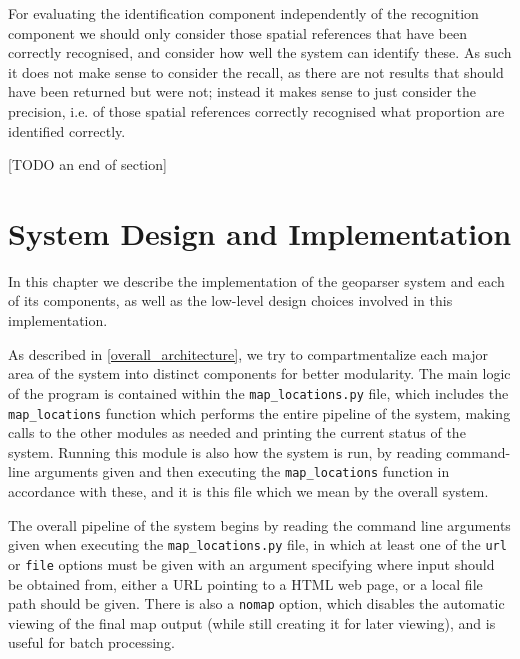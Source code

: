 \documentclass[12pt, a4paper]{report}
\begin{document}
For evaluating the identification component independently of the recognition component we should only consider those spatial references that have been correctly recognised, and consider how well the system can identify these. As such it does not make sense to consider the recall, as there are not results that should have been returned but were not; instead it makes sense to just consider the precision, i.e. of those spatial references correctly recognised what proportion are identified correctly.

[TODO an end of section] 






\chapter{System Design and Implementation}

In this chapter we describe the implementation of the geoparser system and each of its components, as well as the low-level design choices involved in this implementation.

As described in \ref{overall_architecture}, we try to compartmentalize each major area of the system into distinct components for better modularity. The main logic of the program is contained within the \verb#map_locations.py# file, which includes the \verb#map_locations# function which performs the entire pipeline of the system, making calls to the other modules as needed and printing the current status of the system. Running this module is also how the system is run, by reading command-line arguments given and then executing the \verb#map_locations# function in accordance with these, and it is this file which we mean by the overall system.

The overall pipeline of the system begins by reading the command line arguments given when executing the \verb#map_locations.py# file, in which at least one of the \verb#url# or \verb#file# options must be given with an argument specifying where input should be obtained from, either a URL pointing to a HTML web page, or a local file path should be given. There is also a \verb#nomap# option, which disables the automatic viewing of the final map output (while still creating it for later viewing), and is useful for batch processing.
\end{document}
